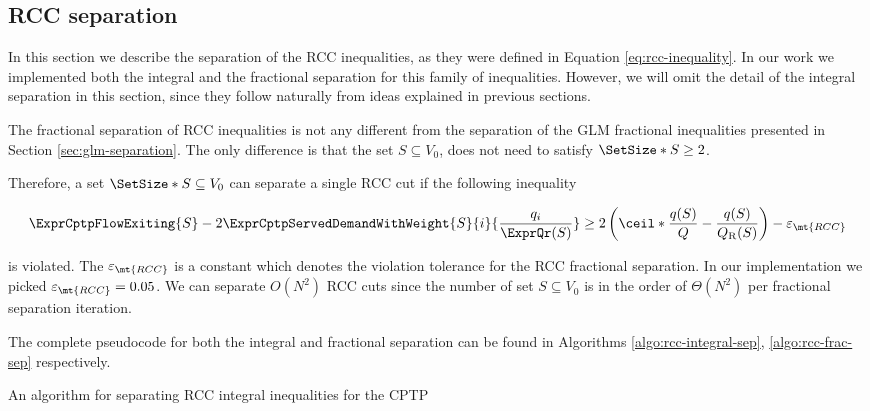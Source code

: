 \subsection{RCC separation}
\label{sec:impl-rcc-separation}

In this section we describe the separation of the RCC inequalities, as they were defined in Equation \eqref{eq:rcc-inequality}.
In our work we implemented both the integral and the fractional separation for this family of inequalities.
However, we will omit the detail of the integral separation in this section, since they follow naturally from ideas explained in previous sections.

The fractional separation of RCC inequalities is not any different from the separation of the GLM fractional inequalities presented in Section \ref{sec:glm-separation}.
The only difference is that the set $S \subseteq V_0$, does not need to satisfy $\SetSize*{S} \ge 2$.

Therefore, a set $\SetSize*{S} \subseteq V_0$ can separate a single RCC cut if the following inequality

\begin{equation}
	\begin{split}
		\ExprCptpFlowExiting{S} -2 \ExprCptpServedDemandWithWeight{S}{i}{\frac{q_i}{\ExprQr(S)}}    \ge   2 \left( \ceil*{ \frac{q(S)}{Q}} - \frac{q(S)}{Q_{\mathrm{R}}(S)} \right) - \varepsilon_{\mt{RCC}}
	\end{split}
\end{equation}

is violated.
The $\varepsilon_{\mt{RCC}}$ is a constant which denotes the violation tolerance for the RCC fractional separation.
In our implementation we picked $\varepsilon_{\mt{RCC}} = 0.05$.
We can separate $O(N^2)$ RCC cuts since the number of set $S \subseteq V_0$ is in the order of $\Theta(N^2)$ per fractional separation iteration.

The complete pseudocode for both the integral and fractional separation can be found in Algorithms \ref{algo:rcc-integral-sep}, \ref{algo:rcc-frac-sep} respectively.

\begin{algorithm}
	\caption{An algorithm for separating RCC integral inequalities for the CPTP}
	\label{algo:rcc-integral-sep}
	
\end{algorithm}

